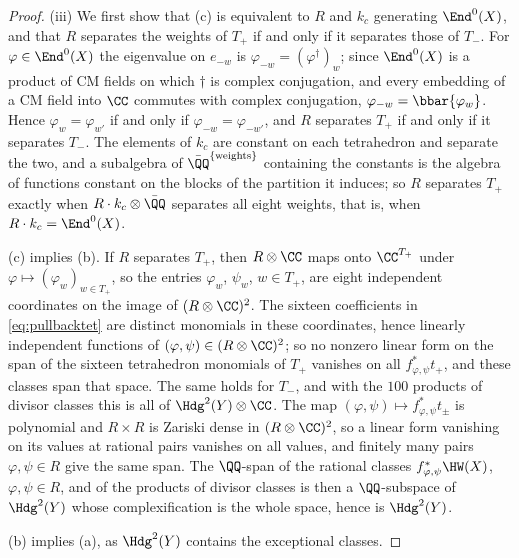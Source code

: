 \begin{proof}
(iii) We first show that (c) is equivalent to $R$ and $k_{c}$ generating
$\End^{0}(X)$, and that $R$ separates the weights of $T_{+}$ if and only if
it separates those of $T_{-}$. For $\varphi\in\End^{0}(X)$ the eigenvalue on
$e_{-w}$ is $\varphi_{-w}=(\varphi^{\dagger})_{w}$; since $\End^{0}(X)$ is a
product of CM fields on which $\dagger$ is complex conjugation, and every
embedding of a CM field into $\CC$ commutes with complex conjugation,
$\varphi_{-w}=\bbar{\varphi_{w}}$. Hence $\varphi_{w}=\varphi_{w'}$ if and
only if $\varphi_{-w}=\varphi_{-w'}$, and $R$ separates $T_{+}$ if and only
if it separates $T_{-}$. The elements of $k_{c}$ are constant on each
tetrahedron and separate the two, and a subalgebra of
$\bar{\QQ}^{\{\text{weights}\}}$ containing the constants is the algebra of
functions constant on the blocks of the partition it induces; so $R$
separates $T_{+}$ exactly when $R\cdot k_{c}\otimes\bar{\QQ}$ separates all
eight weights, that is, when $R\cdot k_{c}=\End^{0}(X)$.

(c) implies (b). If $R$ separates $T_{+}$, then $R\otimes\CC$ maps onto
$\CC^{T_{+}}$ under $\varphi\mapsto(\varphi_{w})_{w\in T_{+}}$, so the
entries $\varphi_{w}$, $\psi_{w}$, $w\in T_{+}$, are eight independent
coordinates on the image of $(R\otimes\CC)^{2}$. The sixteen coefficients in
\eqref{eq:pullbacktet} are distinct monomials in these coordinates, hence
linearly independent functions of $(\varphi,\psi)\in(R\otimes\CC)^{2}$; so
no nonzero linear form on the span of the sixteen tetrahedron monomials of
$T_{+}$ vanishes on all $f_{\varphi,\psi}^{*}t_{+}$, and these classes span
that space. The same holds for $T_{-}$, and with the $100$ products of
divisor classes this is all of $\Hdg^{2}(Y)\otimes\CC$. The map
$(\varphi,\psi)\mapsto f_{\varphi,\psi}^{*}t_{\pm}$ is polynomial and
$R\times R$ is Zariski dense in $(R\otimes\CC)^{2}$, so a linear form
vanishing on its values at rational pairs vanishes on all values, and
finitely many pairs $\varphi,\psi\in R$ give the same span. The $\QQ$-span of
the rational classes $f_{\varphi,\psi}^{*}\HW(X)$, $\varphi,\psi\in R$, and
of the products of divisor classes is then a $\QQ$-subspace of
$\Hdg^{2}(Y)$ whose complexification is the whole space, hence is
$\Hdg^{2}(Y)$.

(b) implies (a), as $\Hdg^{2}(Y)$ contains the exceptional classes.


\end{proof}
